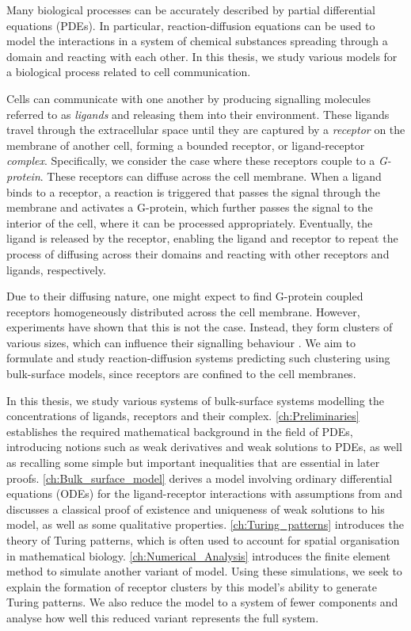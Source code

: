 \vspace{-0.3cm}
Many biological processes can be accurately described by partial differential equations (PDEs). In particular, reaction-diffusion equations can be used to model the interactions in a system of chemical substances spreading through a domain and reacting with each other. In this thesis, we study various models for a biological process related to cell communication.

Cells can communicate with one another by producing signalling molecules referred to as \emph{ligands} and releasing them into their environment. These ligands travel through the extracellular space until they are captured by a \emph{receptor} on the membrane of another cell, forming a bounded receptor, or ligand-receptor \emph{complex}. Specifically, we consider the case where these receptors couple to a \emph{G-protein}. These receptors can diffuse across the cell membrane. When a ligand binds to a receptor, a reaction is triggered that passes the signal through the membrane and activates a G-protein, which further passes the signal to the interior of the cell, where it can be processed appropriately. Eventually, the ligand is released by the receptor, enabling the ligand and receptor to repeat the process of diffusing across their domains and reacting with other receptors and ligands, respectively.

Due to their diffusing nature, one might expect to find G-protein coupled receptors homogeneously distributed across the cell membrane. However, experiments have shown that this is not the case. Instead, they form clusters of various sizes, which can influence their signalling behaviour \cite{kockerkoren24,mandala25}. We aim to formulate and study reaction-diffusion systems predicting such clustering using bulk-surface models, since receptors are confined to the cell membranes.

In this thesis, we study various systems of bulk-surface systems modelling the concentrations of ligands, receptors and their complex. \cref{ch:Preliminaries} establishes the required mathematical background in the field of PDEs, introducing notions such as weak derivatives and weak solutions to PDEs, as well as recalling some simple but important inequalities that are essential in later proofs. \cref{ch:Bulk_surface_model} derives a model involving ordinary differential equations (ODEs) for the ligand-receptor interactions with assumptions from \cite{iber2014} and discusses a classical proof of existence and uniqueness of weak solutions to his model, as well as some qualitative properties. \cref{ch:Turing_patterns} introduces the theory of Turing patterns, which is often used to account for spatial organisation in mathematical biology. \cref{ch:Numerical_Analysis} introduces the finite element method to simulate another variant of model. Using these simulations, we seek to explain the formation of receptor clusters by this model's ability to generate Turing patterns. We also reduce the model to a system of fewer components and analyse how well this reduced variant represents the full system. 

